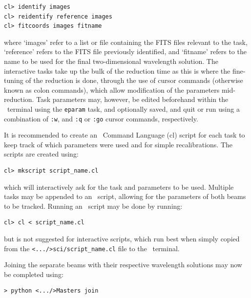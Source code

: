 \begin{verbatim}
cl> identify images
cl> reidentify reference images
cl> fitcoords images fitname
\end{verbatim}

\noindent where `images' refer to a list or file containing the \gls{FITS} files relevant to the task, `reference' refers to the \gls{FITS} file previously identified, and `fitname' refers to the name to be used for the final two-dimensional wavelength solution. The interactive tasks take up the bulk of the reduction time as this is where the fine-tuning of the reduction is done, through the use of cursor commands (otherwise known as colon commands), which allow modification of the parameters mid-reduction. Task parameters may, however, be edited beforehand within the \iraf\ terminal using the \texttt{eparam} task, and optionally saved, and quit or run using a combination of \texttt{:w}, and \texttt{:q} or \texttt{:go} cursor commands, respectively.
\prgph

It is recommended to create an \iraf\ Command Language (cl) script for each task to keep track of which parameters were used and for simple recalibrations. The scripts are created using:

\begin{verbatim}cl> mkscript script_name.cl\end{verbatim}

\noindent which will interactively ask for the task and parameters to be used. Multiple tasks may be appended to an \iraf\ script, allowing for the parameters of both beams to be tracked. Running an \iraf\ script may be done by running:

\begin{verbatim}cl> cl < script_name.cl\end{verbatim}

\noindent but is not suggested for interactive scripts, which run best when simply copied from the \texttt{<.../>sci/script\_name.cl} file to the \iraf\ terminal.
\prgph

\prgph

Joining the separate beams with their respective wavelength solutions may now be completed using:

\begin{verbatim}> python <.../>Masters join\end{verbatim}


